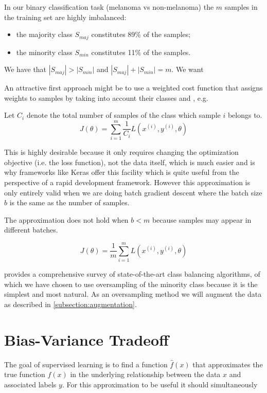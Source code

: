 In our binary classification task (melanoma vs non-melanoma) the $m$ samples in the training set are highly imbalanced:

\begin{itemize}
    \item the majority class $S_{maj}$ constitutes 89\% of the samples;
    \item the minority class $S_{min}$ constitutes 11\% of the samples.
\end{itemize}

We have that $|S_{maj}| > |S_{min}|$ and $|S_{maj}| + |S_{min}| = m$. We want

An attractive first approach might be to use a weighted cost function that assigns weights to samples by taking into account their classes and , e.g.

Let $C_i$ denote the total number of samples of the class which sample $i$ belongs to.
$$
J(\theta) = \sum_{i=1}^{m} \frac{1}{C_i} L(x^{(i)}, y^{(i)}, \theta)
$$

This is highly desirable because it only requires changing the optimization objective (i.e. the loss function), not the data itself, which is much easier and is why frameworks like Keras offer this facility which is quite useful from the perspective of a rapid development framework. However this approximation is only entirely valid when we are doing batch gradient descent where the batch size $b$ is the same as the number of samples.


The approximation does not hold when $b < m$ because samples may appear in different batches.

$$
J(\theta) = \frac{1}{m} \sum_{i=1}^{m} L(x^{(i)}, y^{(i)}, \theta)
$$

\cite{haibo2009} provides a comprehensive survey of state-of-the-art class balancing algorithms, of which we have chosen to use oversampling of the minority class because it is the simplest and most natural. As an oversampling method we will augment the data as described in \ref{subsection:augmentation}.

\section{Bias-Variance Tradeoff}

The goal of supervised learning is to find a function $\hat{f}(x)$ that approximates the true function $f(x)$ in the underlying relationship between the data $x$ and associated labels $y$. For this approximation to be useful it should simultaneously

